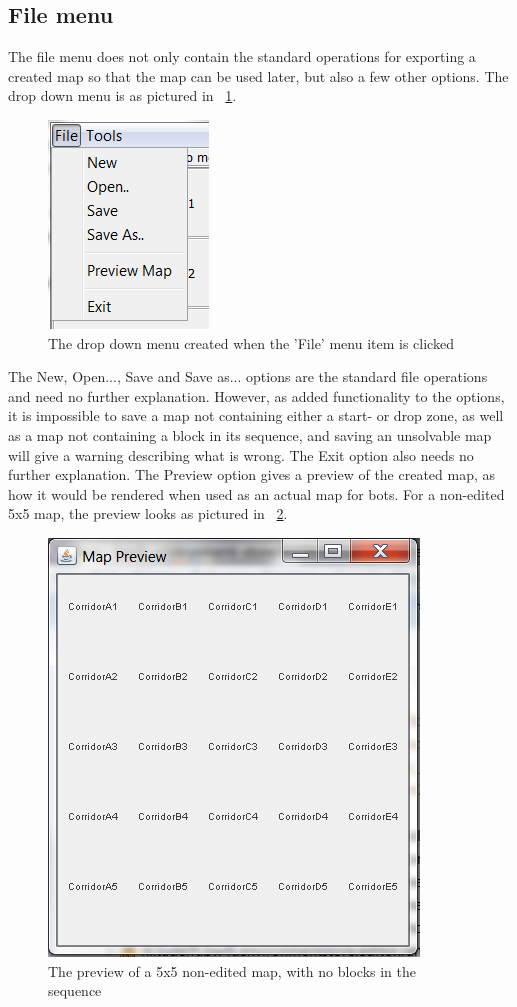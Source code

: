 \subsection{File menu}
The file menu does not only contain the standard operations for exporting a created map so that the map can be used later, but also a few other options. The drop down menu is as pictured in ~\ref{fig:dropFile}.
\begin{figure}[h]
	\includegraphics{NewFeatures/DropDownFile.png}
\caption{The drop down menu created when the 'File' menu item is clicked}
\label{fig:dropFile}
\end{figure}
The New, Open..., Save and Save as... options are the standard file operations and need no further explanation. However, as added functionality to the options, it is impossible to save a map not containing either a start- or drop zone, as well as a map not containing a block in its sequence, and saving an unsolvable map will give a warning describing what is wrong. The Exit option also needs no further explanation. The Preview option gives a preview of the created map, as how it would be rendered when used as an actual map for bots. For a non-edited 5x5 map, the preview looks as pictured in ~\ref{fig:preview}.
\begin{figure}[h]
	\includegraphics{NewFeatures/Preview.png}
\caption{The preview of a 5x5 non-edited map, with no blocks in the sequence}
\label{fig:preview}
\end{figure}
